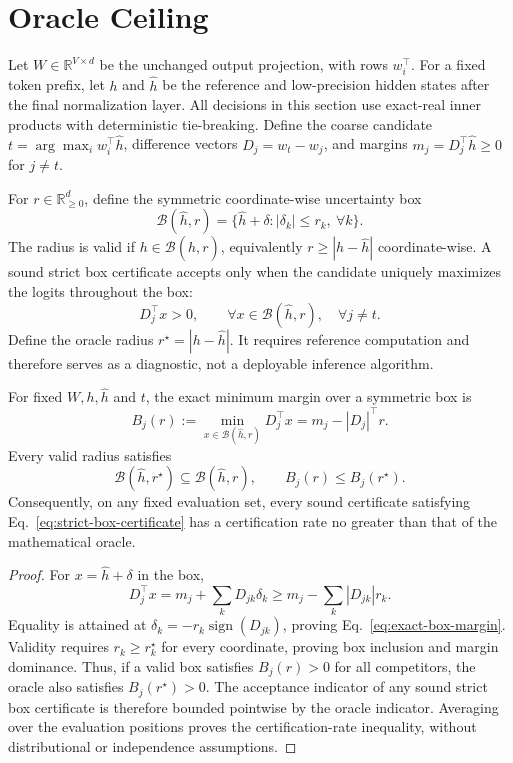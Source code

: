 \section{Oracle Ceiling}
\label{sec:oracle-ceiling}

Let $W\in\mathbb{R}^{V\times d}$ be the unchanged output projection, with rows $w_i^\top$. For a fixed token prefix, let $h$ and $\hat h$ be the reference and low-precision hidden states after the final normalization layer. All decisions in this section use exact-real inner products with deterministic tie-breaking. Define the coarse candidate $t=\arg\max_i w_i^\top\hat h$, difference vectors $D_j=w_t-w_j$, and margins $m_j=D_j^\top\hat h\geq0$ for $j\neq t$.

For $r\in\mathbb{R}_{\geq0}^d$, define the symmetric coordinate-wise uncertainty box
\[
    \mathcal B(\hat h,r)
    =\{\hat h+\delta:|\delta_k|\leq r_k,\ \forall k\}.
\]
The radius is valid if $h\in\mathcal B(\hat h,r)$, equivalently $r\geq|h-\hat h|$ coordinate-wise. A sound strict box certificate accepts only when the candidate uniquely maximizes the logits throughout the box:
\begin{equation}
    D_j^\top x>0,\qquad
    \forall x\in\mathcal B(\hat h,r),\quad\forall j\neq t.
    \label{eq:strict-box-certificate}
\end{equation}
Define the oracle radius $r^\star=|h-\hat h|$. It requires reference computation and therefore serves as a diagnostic, not a deployable inference algorithm.

\begin{theorem}
\label{thm:oracle-ceiling}
For fixed $W,h,\hat h$ and $t$, the exact minimum margin over a symmetric box is
\begin{equation}
    B_j(r):=\min_{x\in\mathcal B(\hat h,r)}D_j^\top x
    =m_j-|D_j|^\top r.
    \label{eq:exact-box-margin}
\end{equation}
Every valid radius satisfies
\[
    \mathcal B(\hat h,r^\star)\subseteq\mathcal B(\hat h,r),
    \qquad B_j(r)\leq B_j(r^\star).
\]
Consequently, on any fixed evaluation set, every sound certificate satisfying Eq.~\eqref{eq:strict-box-certificate} has a certification rate no greater than that of the mathematical oracle.
\end{theorem}

\begin{proof}
For $x=\hat h+\delta$ in the box,
\[
    D_j^\top x=m_j+\sum_kD_{jk}\delta_k
    \geq m_j-\sum_k|D_{jk}|r_k.
\]
Equality is attained at $\delta_k=-r_k\operatorname{sign}(D_{jk})$, proving Eq.~\eqref{eq:exact-box-margin}. Validity requires $r_k\geq r_k^\star$ for every coordinate, proving box inclusion and margin dominance. Thus, if a valid box satisfies $B_j(r)>0$ for all competitors, the oracle also satisfies $B_j(r^\star)>0$. The acceptance indicator of any sound strict box certificate is therefore bounded pointwise by the oracle indicator. Averaging over the evaluation positions proves the certification-rate inequality, without distributional or independence assumptions.
\end{proof}

